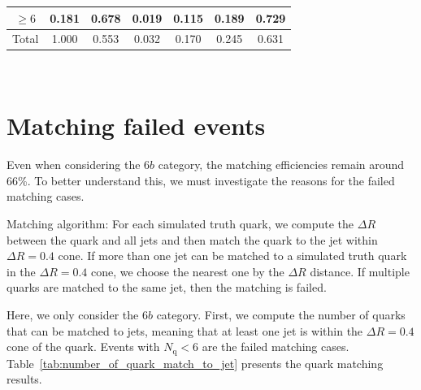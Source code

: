 \documentclass[12pt]{article}
\begin{document}
\begin{table}[htpb]
{\begin{tabular}{c|c|cccc|c}
            $\ge 6$               & 0.181 & 0.678 & 0.019 & 0.115 & 0.189 & 0.729 \\ \hline
            Total                 & 1.000 & 0.553 & 0.032 & 0.170 & 0.245 & 0.631
            \end{tabular}
        } \\
    \end{table}
\section{Matching failed events}%
\label{sec:matching_failed_events}
    Even when considering the $6b$ category, the matching efficiencies remain around 66\%. To better understand this, we must investigate the reasons for the failed matching cases.

    Matching algorithm: For each simulated truth quark, we compute the $\Delta R$ between the quark and all jets and then match the quark to the jet within $\Delta R = 0.4$ cone. If more than one jet can be matched to a simulated truth quark in the $\Delta R = 0.4$ cone, we choose the nearest one by the $\Delta R$ distance. If multiple quarks are matched to the same jet, then the matching is failed.

    Here, we only consider the $6b$ category. First, we compute the number of quarks that can be matched to jets, meaning that at least one jet is within the $\Delta R=0.4$ cone of the quark. Events with $N_{\text{q}} < 6$ are the failed matching cases. Table~\ref{tab:number_of_quark_match_to_jet} presents the quark matching results.
\end{document}

